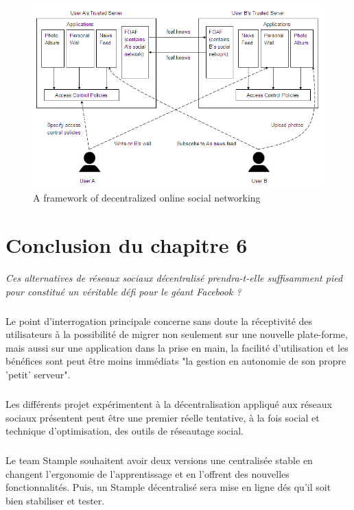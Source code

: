 \begin{figure}
        \centering
                \centering
                \includegraphics[width=\textwidth]{framework.png}
                \caption{A framework of decentralized online social networking}
                \label{fig:A framework of decentralized online social networking}
       
\end{figure}
\newpage
\section{Conclusion du chapitre 6}
\textit{Ces alternatives de réseaux sociaux décentralisé prendra-t-elle suffisamment pied pour constitué un véritable défi pour le géant Facebook ?}
\subparagraph{}
Le point d'interrogation principale concerne sans doute la réceptivité des utilisateurs à la possibilité de migrer non seulement sur une nouvelle plate-forme, mais aussi sur une application dans la prise en main, la facilité d'utilisation et les bénéfices sont peut être moins immédiats "la gestion en autonomie de son propre 'petit' serveur".
\subparagraph{}
Les différents projet expérimentent à la décentralisation appliqué aux réseaux sociaux présentent peut être une premier réelle tentative, à la fois social et technique d'optimisation, des outils de réseautage social.
\subparagraph{}
Le team Stample\cite{Feynman} souhaitent avoir deux versions une centralisée stable en changent l'ergonomie de l'apprentissage et en l'offrent des nouvelles fonctionnalités. Puis, un Stample décentralisé sera mise en ligne dés qu'il soit bien stabiliser et tester.  



